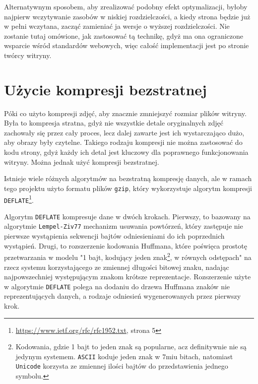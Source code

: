 \documentclass[licencjacka]{pracadypl}
\begin{document}
Alternatywnym sposobem, aby zrealizować podobny efekt optymalizacji, byłoby najpierw wczytywanie zasobów w niskiej rozdzielczości, a kiedy strona będzie już w pełni wczytana, zacząć zamieniać ja wersje o wyższej rozdzielczości. Nie zostanie tutaj omówione, jak zastosować tą technikę, gdyż ma ona ograniczone wsparcie wśród standardów webowych, więc całość implementacji jest po stronie twórcy witryny.


\section{Użycie kompresji bezstratnej}

Póki co użyto kompresji zdjęć, aby znacznie zmniejszyć rozmiar plików witryny. Była to kompresja stratna, gdyż nie wszystkie detale oryginalnych zdjęć zachowały się przez cały proces, lecz dalej zawarte jest ich wystarczająco dużo, aby obrazy były czytelne. Takiego rodzaju kompresji nie można zastosować do kodu strony, gdyż każdy ich detal jest kluczowy dla poprawnego funkcjonowania witryny. Można jednak użyć kompresji bezstratnej.

Istnieje wiele różnych algorytmów na bezstratną kompresję danych, ale w ramach tego projektu użyto formatu plików \texttt{gzip}, który wykorzystuje algorytm kompresji \texttt{DEFLATE}\footnote{\url{https://www.ietf.org/rfc/rfc1952.txt}, strona 5}.

Algorytm \texttt{DEFLATE} kompresuje dane w dwóch krokach. Pierwszy, to bazowany na algorytmie \texttt{Lempel-Ziv77} mechanizm usuwania powtórzeń, który zastępuje nie pierwsze wystąpienia sekwencji bajtów odniesieniami do ich poprzednich wystąpień. Drugi, to rozszerzenie kodowania Huffmana, które poświęca prostotę przetwarzania w modelu "1 bajt, kodujący jeden znak\footnote{Kodowania, gdzie 1 bajt to jeden znak są popularne, acz definitywnie nie są jedynym systemem. \texttt{ASCII} koduje jeden znak w $7$miu bitach, natomiast \texttt{Unicode} korzysta ze zmiennej ilości bajtów do przedstawienia jednego symbolu.}, w równych odstępach" na rzecz systemu korzystającego ze zmiennej długości bitowej znaku, nadając najpowszechniej występującym znakom krótsze reprezentacje. Rozszerzenie użyte w algorytmie \texttt{DEFLATE} polega na dodaniu do drzewa Huffmana znaków nie reprezentujących danych, a rodzaje odniesień wygenerowanych przez pierwszy krok.
\end{document}
